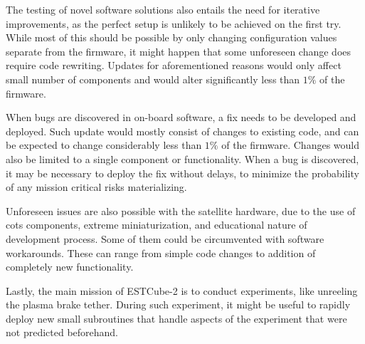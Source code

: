 The testing of novel software solutions also entails the need for iterative improvements, as the perfect setup is unlikely to be achieved on the first try. While most of this should be possible by only changing configuration values separate from the firmware, it might happen that some unforeseen change does require code rewriting. Updates for aforementioned reasons would only affect small number of components and would alter significantly less than $1\%$ of the firmware.

When bugs are discovered in on-board software, a fix needs to be developed and deployed. Such update would mostly consist of changes to existing code, and can be expected to change considerably less than $1\%$ of the firmware. Changes would also be limited to a single component or functionality. When a bug is discovered, it may be necessary to deploy the fix without delays, to minimize the probability of any mission critical risks materializing.

Unforeseen issues are also possible with the satellite hardware, due to the use of \gls{cots} components, extreme miniaturization, and educational nature of development process. Some of them could be circumvented with software workarounds. These can range from simple code changes to addition of completely new functionality.

Lastly, the main mission of ESTCube-2 is to conduct experiments, like unreeling the plasma brake tether. During such experiment, it might be useful to rapidly deploy new small subroutines that handle aspects of the experiment that were not predicted beforehand.
